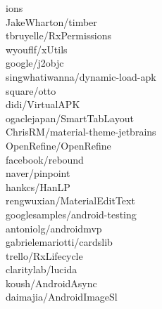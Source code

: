 \documentclass[twoside]{praca}
\begin{document}
\begin{multicols}{3}
ions\\JakeWharton/timber\\tbruyelle/RxPermissions\\wyouflf/xUtils\\google/j2objc\\singwhatiwanna/dynamic-load-apk\\square/otto\\didi/VirtualAPK\\ogaclejapan/SmartTab\-Layout\\ChrisRM/material-theme-jetbrains\\OpenRefine/OpenRefine\\facebook/rebound\\naver/pinpoint\\hankcs/HanLP\\rengwuxian/MaterialEdit\-Text\\googlesamples/android-testing\\antoniolg/androidmvp\\gabrielemariotti/cardslib\\trello/RxLifecycle\\claritylab/lucida\\koush/AndroidAsync\\daimajia/AndroidImage\-Sl
\end{multicols}
\end{document}
